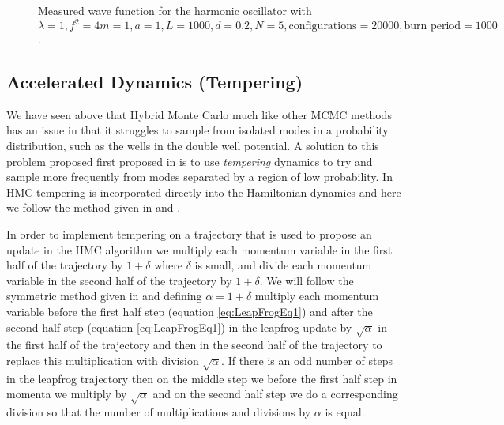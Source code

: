 \documentclass[12pt]{article}
\begin{document}
                \begin{figure}
                    \centering
                    \caption{Measured wave function for the harmonic oscillator with $\lambda = 1, f^2=4 m = 1, a = 1, L = 1000, d = 0.2, N = 5, \text{configurations} = 20000, \text{burn period} = 1000$.}
                    \label{fig:AnharmonicOscillatorIsolatedModes}
                \end{figure}
    \label{sec:Tempering}
    \subsection{Accelerated Dynamics (Tempering)}
    We have seen above that Hybrid Monte Carlo much like other MCMC methods \cite{neal_2011} has an issue in that it struggles to sample from isolated modes in a probability distribution, such as the wells in the double well potential. A solution to this problem proposed first proposed in \cite{neal_1996_b} is to use \textit{tempering} dynamics to try and sample more frequently from modes separated by a region of low probability. In HMC tempering is incorporated directly into the Hamiltonian dynamics and here we follow the method given in \cite{neal_1996_b} and \cite{neal_2011}.  

    In order to implement tempering on a trajectory that is used to propose an update in the HMC algorithm we multiply each momentum variable in the first half of the trajectory by $1+\delta$ where $\delta$ is small, and divide each momentum variable in the second half of the trajectory by $1+\delta$. We will follow the symmetric method given in \cite{neal_2011} and defining $\alpha=1+\delta$ multiply each momentum variable before the first half step (equation \ref{eq:LeapFrogEq1}) and after the second half step (equation \ref{eq:LeapFrogEq1}) in the leapfrog update by $\sqrt{\alpha}$ in the first half of the trajectory and then in the second half of the trajectory to replace this multiplication with division $\sqrt{\alpha}$. If there is an odd number of steps in the leapfrog trajectory then on the middle step we before the first half step in momenta we multiply by $\sqrt{\alpha}$  and on the second half step we do a corresponding division so that the number of multiplications and divisions by $\alpha$ is equal.
\end{document}
